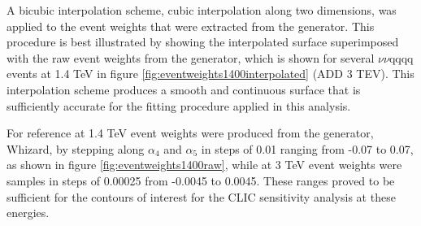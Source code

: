A bicubic interpolation scheme, cubic interpolation along two dimensions, was applied to the event weights that were extracted from the generator.  This procedure is best illustrated by showing the interpolated surface superimposed with the raw event weights from the generator, which is shown for several $\nu\nu\text{qqqq}$ events at 1.4 TeV in figure \ref{fig:eventweights1400interpolated} (ADD 3 TEV).  This interpolation scheme produces a smooth and continuous surface that is sufficiently accurate for the fitting procedure applied in this analysis.  

For reference at 1.4 TeV event weights were produced from the generator, Whizard, by stepping along $\alpha_{4}$ and $\alpha_{5}$ in steps of 0.01 ranging from -0.07 to 0.07, as shown in figure \ref{fig:eventweights1400raw}, while at 3 TeV event weights were samples in steps of 0.00025 from -0.0045 to 0.0045.  These ranges proved to be sufficient for the contours of interest for the CLIC sensitivity analysis at these energies.

